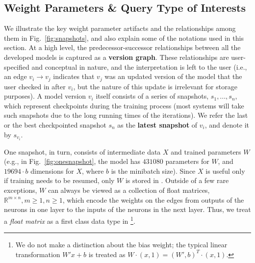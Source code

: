 \documentclass[conference]{IEEEtran}
\begin{document}
\subsection{Weight Parameters \& Query Type of Interests}
\label{subsec:pas_query_interests}
We illustrate the key weight parameter artifacts and the relationships among them in Fig.~\ref{fig:snapshots}, and also explain some of the notations
used in this section.
At a high level, the predecessor-successor relationships between all the developed models is captured as a {\bf version graph}. These relationships are user-specified and 
conceptual in nature, and the interpretation is left to the user (i.e., an edge $v_i \rightarrow v_j$ indicates that $v_j$ was an updated version of the model that the user
checked in after $v_i$, but the nature of this update is irrelevant for storage purposes). 
A model version $v_i$ itself consists of a series of snapshots, $s_1, ..., s_n$, which represent checkpoints during the training process (most systems will take such snapshots
due to the long running times of the iterations).
We refer the last or the best checkpointed snapshot $s_n$ as the \textbf{latest snapshot} of $v_i$, and denote it by $s_{v_i}$. 

One snapshot, in turn, consists of intermediate data $X$ and trained parameters $W$ (e.g., in Fig.~\ref{fig:onesnapshot}, the model has $431080$ parameters for $W$, and $19694\cdot b$ dimensions for $X$, where $b$ is the minibatch size). Since $X$ is useful only if training needs to be resumed, only $W$ is stored in \weightstore. 
Outside of a few rare exceptions, $W$ can always be viewed as a collection of float matrices, $\mathbb{R}^{m\times n}, m \geq 1, n \geq 1$, which encode the weights on the edges from outputs of the neurons in one layer to the inputs of the neurons in the next layer. Thus, we treat a {\em float matrix} as a first class data type in \weightstore\footnote{We do not make a distinction about the bias weight; the typical linear transformation $W'x+b$ is treated as $W\cdot(x,1) = (W',b)^T\cdot(x,1)$.}.
\end{document}
